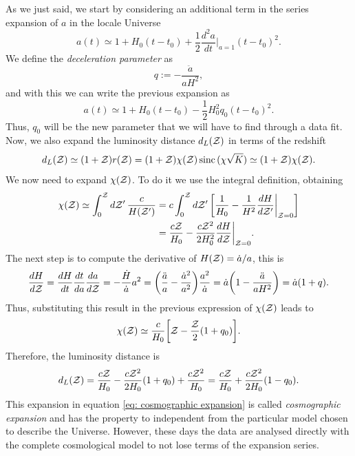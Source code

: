 As we just said, we start by considering an additional term in the series expansion of $a$ in the locale Universe
\begin{equation}
    a(t) \simeq 1 + H_0(t - t_0) + \frac{1}{2}\frac{d^2a}{dt}\bigg|_{a = 1}(t - t_0)^2.
\end{equation}
We define the \emph{deceleration parameter} as 
\begin{equation}
\label{eq: deceleration parameter}
    q := -\frac{\ddot{a}}{aH^2},
\end{equation}
and with this we can write the previous expansion as
\begin{equation}
    a(t) \simeq 1 + H_0(t - t_0) - \frac{1}{2}H_0^2q_0(t - t_0)^2.
\end{equation}
Thus, $q_0$ will be the new parameter that we will have to find through a data fit. Now, we also expand the luminosity distance $d_L(\mathcal{Z})$ in terms of the redshift 
\begin{equation}
    d_L(\mathcal{Z}) \simeq (1 + \mathcal{Z})r(\mathcal{Z}) = (1 + \mathcal{Z})\chi(\mathcal{Z})\,\mathrm{sinc}\,{(\chi\sqrt{K})} \simeq (1 + \mathcal{Z})\chi(\mathcal{Z}).
\end{equation}
We now need to expand $\chi(\mathcal{Z})$. To do it we use the integral definition, obtaining
\begin{equation}
    \begin{split}
        \chi(\mathcal{Z}) \simeq \int_0^{\mathcal{Z}}d\mathcal{Z}'\,\frac{c}{H(\mathcal{Z}')} &= c\int_0^{\mathcal{Z}}d\mathcal{Z}'\,\bigg[\frac{1}{H_0} - \frac{1}{H^2}\frac{dH}{d\mathcal{Z}'}\bigg|_{\mathcal{Z} = 0}\bigg] \\
        &= \frac{c\mathcal{Z}}{H_0} - \frac{c\mathcal{Z}^2}{2H_0^2}\frac{dH}{d\mathcal{Z}}\bigg|_{\mathcal{Z} = 0}.
    \end{split}
\end{equation}
The next step is to compute the derivative of $H(\mathcal{Z}) = \dot{a}/a$, this is 
\begin{equation}
    \frac{dH}{d\mathcal{Z}} = \frac{dH}{dt}\frac{dt}{da}\frac{da}{d\mathcal{Z}} = -\frac{\dot{H}}{\dot{a}}a^2 = \bigg(\frac{\ddot{a}}{a} - \frac{\dot{a}^2}{a^2}\bigg)\frac{a^2}{\dot{a}} = \dot{a}\bigg(1 - \frac{\ddot{a}}{aH^2}\bigg) = \dot{a}(1 + q).
\end{equation}
Thus, substituting this result in the previous expression of $\chi(\mathcal{Z})$ leads to 
\begin{equation}
    \chi(\mathcal{Z}) \simeq \frac{c}{H_0}\bigg[\mathcal{Z} - \frac{\mathcal{Z}}{2}(1 + q_0)\bigg].
\end{equation}
Therefore, the luminosity distance is 
\begin{equation}
\label{eq: cosmographic expansion}
    d_L(\mathcal{Z}) = \frac{c\mathcal{Z}}{H_0} - \frac{c\mathcal{Z}^2}{2H_0}(1 + q_0) + \frac{c\mathcal{Z}^2}{H_0} = \frac{c\mathcal{Z}}{H_0} + \frac{c\mathcal{Z}^2}{2H_0}(1 - q_0).
\end{equation}
This expansion in equation \eqref{eq: cosmographic expansion} is called \emph{cosmographic expansion} and has the property to independent from the particular model chosen to describe the Universe. However, these days the data are analysed directly with the complete cosmological model to not lose terms of the expansion series. 

